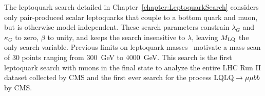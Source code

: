 The leptoquark search detailed in Chapter~\ref{chapter:LeptoquarkSearch} considers only pair-produced scalar leptoquarks that couple to a bottom quark and muon, but is otherwise model independent. These search parameters constrain $\lambda_G$ and $\kappa_G$ to zero, $\beta$ to unity, and keeps the search insensitive to $\lambda$, leaving $M_{\mathrm{LQ}}$ the only search variable. Previous limits on leptoquark masses~\cite{CMSLQ2_2019} motivate a mass scan of 30 points ranging from 300~GeV to 4000~GeV. This search is the first leptoquark search with muons in the final state to analyze the entire LHC Run II dataset collected by CMS and the first ever search for the process $\mathrm{LQ}\mathrm{LQ}\rightarrow\mu\mu bb$ by CMS.